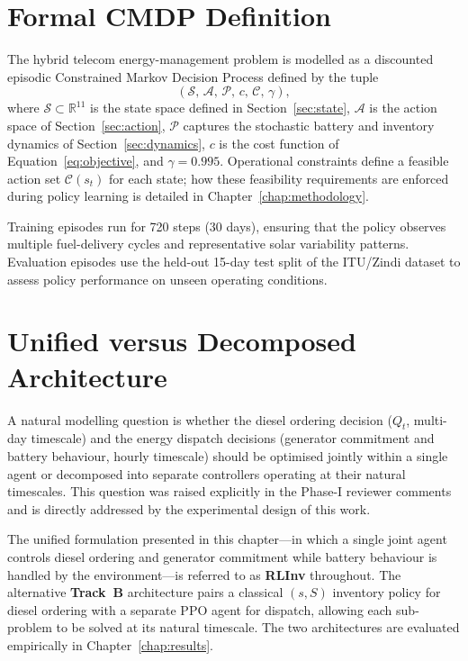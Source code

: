 \section{Formal CMDP Definition}
\label{sec:cmdp}

The hybrid telecom energy-management problem is modelled as a discounted
episodic Constrained Markov Decision Process defined by the tuple
\[
(\mathcal{S},\,\mathcal{A},\,\mathcal{P},\,c,\,\mathcal{C},\,\gamma),
\]
where $\mathcal{S} \subset \mathbb{R}^{11}$ is the state space defined in
Section~\ref{sec:state}, $\mathcal{A}$ is the action space of
Section~\ref{sec:action}, $\mathcal{P}$ captures the stochastic battery and
inventory dynamics of Section~\ref{sec:dynamics}, $c$ is the cost function
of Equation~\eqref{eq:objective}, and $\gamma = 0.995$. Operational
constraints define a feasible action set $\mathcal{C}(s_t)$ for each state;
how these feasibility requirements are enforced during policy learning is
detailed in Chapter~\ref{chap:methodology}.

Training episodes run for 720 steps (30 days), ensuring that the policy
observes multiple fuel-delivery cycles and representative solar variability
patterns. Evaluation episodes use the held-out 15-day test split of the
ITU/Zindi dataset to assess policy performance on unseen operating conditions.

\section{Unified versus Decomposed Architecture}
\label{sec:unified_vs_hier}

A natural modelling question is whether the diesel ordering decision
($Q_t$, multi-day timescale) and the energy dispatch decisions (generator
commitment and battery behaviour, hourly timescale) should be optimised
jointly within a single agent or decomposed into separate controllers
operating at their natural timescales. This question was raised explicitly
in the Phase-I reviewer comments and is directly addressed by the
experimental design of this work.

The unified formulation presented in this chapter---in which a single
joint agent controls diesel ordering and generator commitment while battery
behaviour is handled by the environment---is referred to as \textbf{RLInv}
throughout. The alternative \textbf{Track~B} architecture pairs a classical
$(s,S)$ inventory policy for diesel ordering with a separate PPO agent for
dispatch, allowing each sub-problem to be solved at its natural timescale.
The two architectures are evaluated empirically in
Chapter~\ref{chap:results}.

